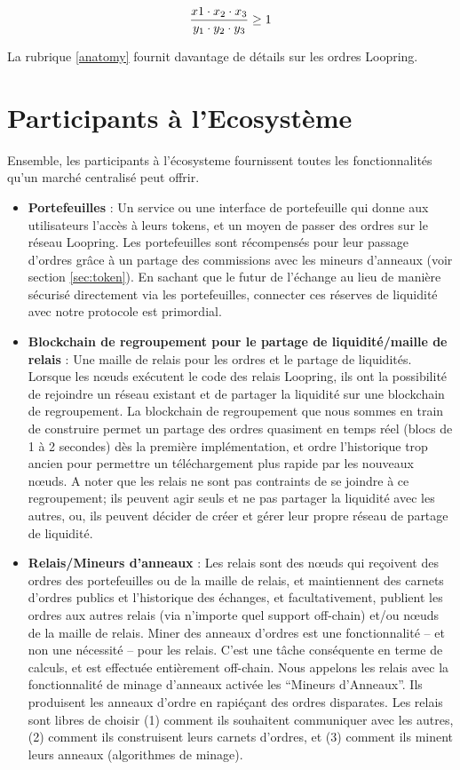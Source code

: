 \documentclass[UTF8,nofonts]{article}
\begin{document}
\begin{multicols}{2}
\begin{equation}
{{x1 \cdot x_2 \cdot x_3 \over y_1 \cdot y_2 \cdot y_3} \geq 1}
\end{equation}


La rubrique \ref{anatomy} fournit davantage de détails sur les ordres Loopring.


\section{Participants à l'Ecosystème\label{sec:ecosystem}}
Ensemble, les participants à l'écosysteme fournissent toutes les fonctionnalités qu'un marché centralisé peut offrir. 

\begin{itemize}

\item \textbf{Portefeuilles} : Un service ou une interface de portefeuille qui donne aux utilisateurs l'accès à leurs tokens, et un moyen de passer des ordres sur le réseau Loopring. Les portefeuilles sont récompensés pour leur passage d'ordres grâce à un partage des commissions avec les mineurs d'anneaux (voir section \ref{sec:token}). En sachant que le futur de l'échange au lieu de manière sécurisé directement via les portefeuilles, connecter ces réserves de liquidité avec notre protocole est primordial.

\item \textbf{Blockchain de regroupement pour le partage de liquidité/maille de relais} : Une maille de relais pour les ordres et le partage de liquidités. Lorsque les nœuds exécutent le code des relais Loopring, ils ont la possibilité de rejoindre un réseau existant et de partager la liquidité sur une blockchain de regroupement. La blockchain de regroupement que nous sommes en train de construire permet un partage des ordres quasiment en temps réel (blocs de 1 à 2 secondes) dès la première implémentation, et ordre l'historique trop ancien pour permettre un téléchargement plus rapide par les nouveaux nœuds. A noter que les relais ne sont pas contraints de se joindre à ce regroupement; ils peuvent agir seuls et ne pas partager la liquidité avec les autres, ou, ils peuvent décider de créer et gérer leur propre réseau de partage de liquidité.

\item \textbf{Relais/Mineurs d'anneaux} : Les relais sont des nœuds qui reçoivent des ordres des portefeuilles ou de la maille de relais, et maintiennent des carnets d'ordres publics et l'historique des échanges, et facultativement, publient les ordres aux autres relais (via n'importe quel support off-chain) et/ou nœuds de la maille de relais. Miner des anneaux d'ordres est une fonctionnalité -- et non une nécessité -- pour les relais. C'est une tâche conséquente en terme de calculs, et est effectuée entièrement off-chain. Nous appelons les relais avec la fonctionnalité de minage d'anneaux activée les \enquote{Mineurs d'Anneaux}. Ils produisent les anneaux d'ordre en rapiéçant des ordres disparates. Les relais sont libres de choisir (1) comment ils souhaitent communiquer avec les autres, (2) comment ils construisent leurs carnets d'ordres, et (3) comment ils minent leurs anneaux (algorithmes de minage).


\end{itemize}
\end{multicols}
\end{document}
